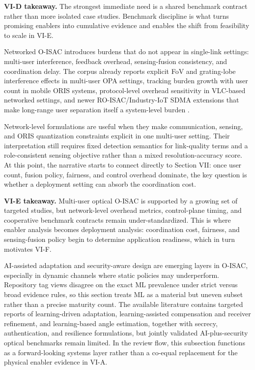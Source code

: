 \documentclass[letterpaper,journal]{IEEEtran}
\begin{document}
\textbf{VI-D takeaway.} The strongest immediate need is a shared benchmark contract rather than more isolated case studies. Benchmark discipline is what turns promising enablers into cumulative evidence and enables the shift from feasibility to scale in VI-E.

Networked O-ISAC introduces burdens that do not appear in single-link settings: multi-user interference, feedback overhead, sensing-fusion consistency, and coordination delay. The corpus already reports explicit FoV and grating-lobe interference effects in multi-user OPA settings, tracking burden growth with user count in mobile ORIS systems, protocol-level overhead sensitivity in VLC-based networked settings, and newer RO-ISAC/Industry-IoT SDMA extensions that make long-range user separation itself a system-level burden .

Network-level formulations are useful when they make communication, sensing, and ORIS quantization constraints explicit in one multi-user setting. Their interpretation still requires fixed detection semantics for link-quality terms and a role-consistent sensing objective rather than a mixed resolution-accuracy score. At this point, the narrative starts to connect directly to Section VII: once user count, fusion policy, fairness, and control overhead dominate, the key question is whether a deployment setting can absorb the coordination cost.

\textbf{VI-E takeaway.} Multi-user optical O-ISAC is supported by a growing set of targeted studies, but network-level overhead metrics, control-plane timing, and cooperative benchmark contracts remain under-standardized. This is where enabler analysis becomes deployment analysis: coordination cost, fairness, and sensing-fusion policy begin to determine application readiness, which in turn motivates VI-F.

AI-assisted adaptation and security-aware design are emerging layers in O-ISAC, especially in dynamic channels where static policies may underperform. Repository tag views disagree on the exact ML prevalence under strict versus broad evidence rules, so this section treats ML as a material but uneven subset rather than a precise maturity count. The available literature contains targeted reports of learning-driven adaptation, learning-assisted compensation and receiver refinement, and learning-based angle estimation, together with secrecy, authentication, and resilience formulations, but jointly validated AI-plus-security optical benchmarks remain limited. In the review flow, this subsection functions as a forward-looking systems layer rather than a co-equal replacement for the physical enabler evidence in VI-A.
\end{document}
